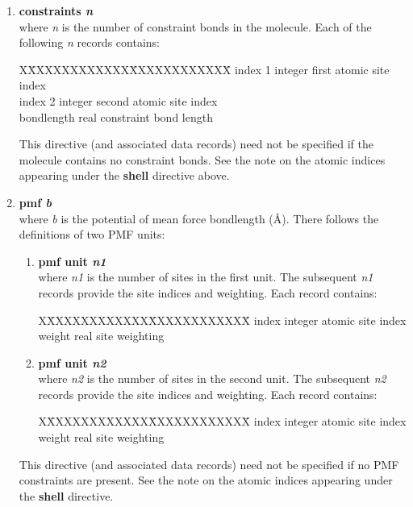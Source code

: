 \begin{enumerate}
{\bf Note} that the atomic site indices referred to above are
indices arising from numbering each atom in the molecule from 1 to
the number specified in the {\bf atoms} directive for this
molecule.  This same numbering scheme should be used for all
descriptions of this molecule, including the {\bf constraints},
{\bf pmf}, {\bf rigid}, {\bf teth}, {\bf bonds}, {\bf angles},
{\bf dihedrals} and {\bf inversions} entries described below.
\D will itself construct the global indices for all atoms in the systems.

This directive (and associated data records) need not be specified if
the molecule contains no core-shell units.

\item {\bf constraints {\em n}} \\
where {\em n} is the number of constraint bonds in the molecule.
Each of the following {\em n} records contains:
\begin{tabbing}
X\=XXXXXXXXXXXX\=XXXXXXXXXXXX\=\kill
\> index 1    \> integer \> first atomic site index \\
\> index 2    \> integer \> second atomic site index \\
\> bondlength \> real    \> constraint bond length
\end{tabbing}
This directive (and associated data records) need not be specified
if the molecule contains no constraint
bonds.  See the note on the atomic indices
appearing under the {\bf shell} directive above.

\item {\bf pmf {\em b}} \\
where {\em b} is the potential of mean force bondlength (\AA).
There follows the definitions of two PMF units:
\begin{enumerate}
\item {\bf pmf unit {\em n1}} \\
where {\em n1} is the number of sites in the first unit.  The subsequent
{\em n1} records provide the site indices and weighting.  Each record contains:
\begin{tabbing}
X\=XXXXXXXXXXXX\=XXXXXXXXXXXX\=\kill
\> index      \> integer \> atomic site index \\
\> weight     \> real    \> site weighting
\end{tabbing}
\item {\bf pmf unit {\em n2}} \\
where {\em n2} is the number of sites in the second unit.  The subsequent
{\em n2} records provide the site indices and weighting.  Each record contains:
\begin{tabbing}
X\=XXXXXXXXXXXX\=XXXXXXXXXXXX\=\kill
\> index      \> integer \> atomic site index \\
\> weight     \> real    \> site weighting
\end{tabbing}
\end{enumerate}
This directive (and associated data records) need not be specified
if no PMF constraints are present.  See the
note on the atomic indices appearing under the {\bf shell} directive.


\end{enumerate}
